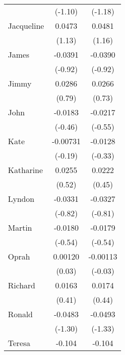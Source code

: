 {\begin{tabular}{l*{2}{c}}
                    &     (-1.10)         &     (-1.18)         \\
[1em]
Jacqueline          &      0.0473         &      0.0481         \\
                    &      (1.13)         &      (1.16)         \\
[1em]
James               &     -0.0391         &     -0.0390         \\
                    &     (-0.92)         &     (-0.92)         \\
[1em]
Jimmy               &      0.0286         &      0.0266         \\
                    &      (0.79)         &      (0.73)         \\
[1em]
John                &     -0.0183         &     -0.0217         \\
                    &     (-0.46)         &     (-0.55)         \\
[1em]
Kate                &    -0.00731         &     -0.0128         \\
                    &     (-0.19)         &     (-0.33)         \\
[1em]
Katharine           &      0.0255         &      0.0222         \\
                    &      (0.52)         &      (0.45)         \\
[1em]
Lyndon              &     -0.0331         &     -0.0327         \\
                    &     (-0.82)         &     (-0.81)         \\
[1em]
Martin              &     -0.0180         &     -0.0179         \\
                    &     (-0.54)         &     (-0.54)         \\
[1em]
Oprah               &     0.00120         &    -0.00113         \\
                    &      (0.03)         &     (-0.03)         \\
[1em]
Richard             &      0.0163         &      0.0174         \\
                    &      (0.41)         &      (0.44)         \\
[1em]
Ronald              &     -0.0483         &     -0.0493         \\
                    &     (-1.30)         &     (-1.33)         \\
[1em]
Teresa              &      -0.104\sym{*}  &      -0.104\sym{*}  \\

\end{tabular}}
